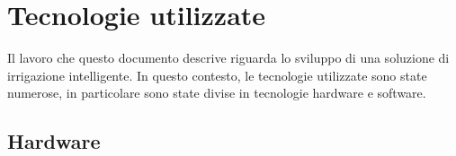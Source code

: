 \documentclass[12pt,a4paper,openright,twoside]{book}
\begin{document}
\newpage

\chapter{Tecnologie utilizzate}


Il lavoro che questo documento descrive riguarda lo sviluppo di una soluzione di irrigazione intelligente. In questo contesto, le tecnologie utilizzate sono state numerose, in particolare sono state divise in tecnologie hardware e software.

\section{Hardware}
\end{document}
